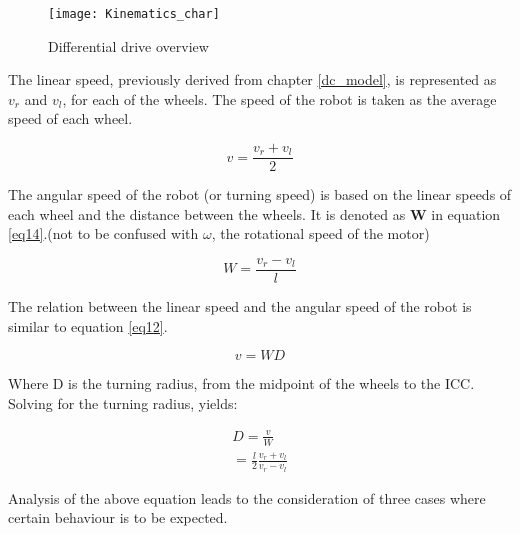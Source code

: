\begin{figure}[h]
\centering
\texttt{[image: Kinematics\_char]}
\caption{Differential drive overview\cite{DDO}}
\label{fig::diff_drive_over}
\end{figure}

The linear speed, previously derived from chapter \ref{dc_model}, is represented as $v_r$ and $v_l$, for each of the wheels. The speed of the robot is taken as the average speed of each wheel.

\begin{equation} \label{eq13}
v = \frac{v_r + v_l}{2} 
\end{equation}

The angular speed of the robot (or turning speed) is based on the linear speeds of each wheel and the distance between the wheels. It is denoted as \textbf{W} in equation \ref{eq14}.(not to be confused with $\omega$, the rotational speed of the motor)

\begin{equation} \label{eq14}
W = \frac{v_r - v_l}{l}
\end{equation}

The relation between the linear speed and the angular speed of the robot is similar to equation \ref{eq12}.

\begin{equation} \label{eq15} 
v = WD
\end{equation}

Where D is the turning radius, from the midpoint of the wheels to the ICC. Solving for the turning radius, yields:

\begin{align}
D = \frac{v}{W} \label{eq16} \\
= \frac{l}{2}\frac{v_r + v_l}{v_r - v_l} \nonumber
\end{align}

Analysis of the above equation leads to the consideration of three cases where certain behaviour is to be expected.

